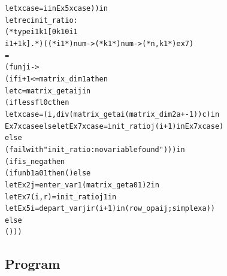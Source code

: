 \documentclass{article}
\newcommand{\tmverbatim}[1]{{\ttfamily{#1}}}
\newenvironment{tmcode}[1][]{\begin{alltt}}{\end{alltt}}
\begin{document}
\begin{tmcode}
      let xcase = i in Ex5 xcase)) in
    let rec init_ratio :
    (*type i1 k1 [0  k1  0  i1 
      i1 + 1  k].*) ((* i1 *) num -> (* k1 *) num -> (* n, k1 *) ex7)
    =
    (fun j i ->
      (if i + 1 <= matrix_dim1 a then
        let c = matrix_get a i j in
        (if less fl0 c then
        let xcase = (i, div (matrix_get a i (matrix_dim2 a + -1)) c) in
        Ex7 xcase else let Ex7 xcase = init_ratio j (i + 1) in Ex7 xcase)
      else
        (failwith "init_ratio: no variable found"))) in
    (if is_neg a then
    (if unb1 a 0 1 then () else
      let Ex2 j = enter_var 1 (matrix_get a 0 1) 2 in
      let Ex7 (i, r) = init_ratio j 1 in
      let Ex5 i = depart_var j i r (i + 1) in (row_op a i j ; simplex a))
    else
      ()))
\end{tmcode}

\subsection{Program \tmverbatim{gauss}}
\end{document}

